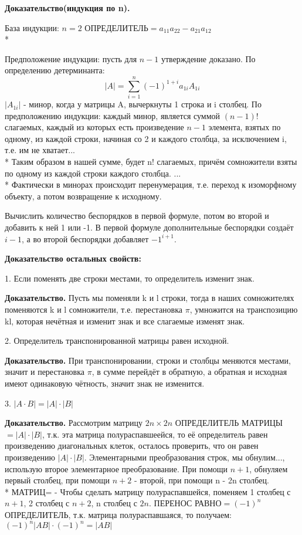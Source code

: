 \documentclass{article}
\begin{document}
{\bf Доказательство(индукция по n).}

База индукции: $n=2$
ОПРЕДЕЛИТЕЛЬ$=a_{11}a_{22}-a_{21}a_{12}$\\*

Предположение индукции: пусть для $n-1$ утверждение доказано. По определению детерминанта: $$|A|=\sum_{i=1}^n (-1)^{1+i}a_{1i}A_{1i}$$
$|A_{1i}|$ - минор, когда у матрицы A, вычеркнуты 1 строка и i столбец. По предположению индукции: каждый минор, является суммой $(n-1)!$ слагаемых, каждый из которых есть произведение $n-1$ элемента, взятых по одному, из каждой строки, начиная со 2 и каждого столбца, за исключением i, т.е. им не хватает...\\*
Таким образом в нашей сумме, будет n! слагаемых, причём сомножители взяты по одному из каждой строки каждого столбца. ...\\*
Фактически в минорах происходит перенумерация, т.е. переход к изоморфному объекту, а потом возвращение к исходному.

Вычислить количество беспорядков в первой формуле, потом во второй и добавить к ней 1 или -1. В первой формуле дополнительные беспорядки создаёт $i-1$, а во второй беспорядки добавляет $-1^{i+1}$.

{\bf Доказательство остальных свойств:}

1. Если поменять две строки местами, то определитель изменит знак.

{\bf Доказательство.} Пусть мы поменяли k и l строки, тогда в наших сомножителях поменяются k и l сомножители, т.е. перестановка $\pi$, умножится на транспозицию kl, которая нечётная и изменит знак и все слагаемые изменят знак.

2. Определитель транспонированной матрицы равен исходной.

{\bf Доказательство.} При транспонировании, строки и столбцы меняются местами, значит и перестановка $\pi$, в сумме перейдёт в обратную, а обратная и исходная имеют одинаковую чётность, значит знак не изменится.

3. $|A\cdot B|=|A|\cdot|B|$

{\bf Доказательство.} Рассмотрим матрицу $2n\times 2n$ ОПРЕДЕЛИТЕЛЬ МАТРИЦЫ $=|A|\cdot|B|$, т.к. эта матрица полураспавшеейся, то её определитель равен произведению диагональных клеток, осталось проверить, что он равен произведению  $|A|\cdot|B|$. Элементарными преобразования строк, мы обнулим..., использую второе элементарное преобразование. При помощи $n+1$, обнуляем первый столбец, при помощи $n+2$ - второй, при помощи n - 2n столбец.\\*
МАТРИЦ= - Чтобы сделать матрицу полураспавшейся, поменяем 1 столбец с $n+1$, 2 столбец с $n+2$, n столбец с $2n$.
ПЕРЕНОС РАВНО$=(-1)^n$ ОПРЕДЕЛИТЕЛЬ, т.к. матрица полураспавшаяся, то получаем: $(-1)^n |AB|\cdot(-1)^n=|AB|$
\end{document}
